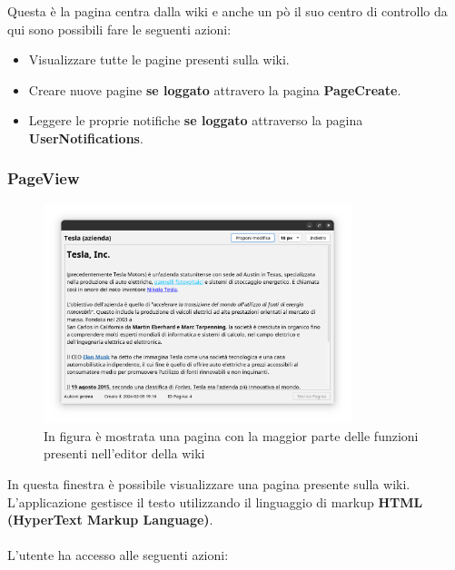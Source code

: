 \documentclass{article}
\begin{document}
	Questa \`e la pagina centra dalla wiki e anche un p\`o il suo centro di controllo da qui sono possibili fare le seguenti azioni:
	
	\begin{itemize}
		\item Visualizzare tutte le pagine presenti sulla wiki.
		
		\item Creare nuove pagine \textbf{se loggato} attravero la pagina \textbf{PageCreate}.
		
		\item Leggere le proprie notifiche \textbf{se loggato} attraverso la pagina \textbf{UserNotifications}.
	\end{itemize}
	
	\newpage
	
	{\subsubsection{PageView}}
	
	\begin{figure}[htbp]
		\centering
		\includegraphics[width=0.8\textwidth,height=0.8\textheight,keepaspectratio]{page_view.png}
		\caption{In figura \`e mostrata una pagina con la maggior parte delle funzioni presenti nell'editor della wiki}
		\label{fig:4}
	\end{figure}
	
	In questa finestra \`e possibile visualizzare una pagina presente sulla wiki.\\
	L'applicazione gestisce il testo utilizzando il linguaggio di markup {\textbf{HTML (HyperText Markup Language)}}. \\\\
	
	L'utente ha accesso alle seguenti azioni:
	
\end{document}
